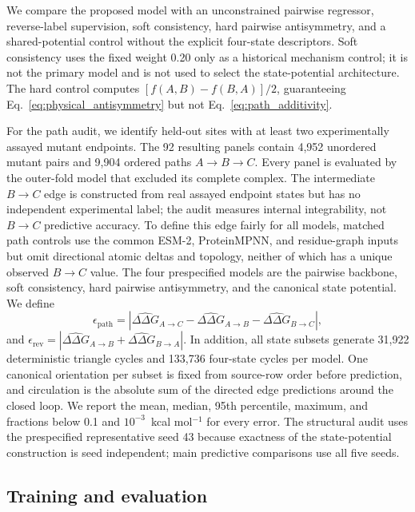 \documentclass[preprint,12pt]{elsarticle}
\newcommand{\ddg}{\Delta\Delta G}
\begin{document}
We compare the proposed model with an unconstrained pairwise regressor, reverse-label supervision, soft consistency, hard pairwise antisymmetry, and a shared-potential control without the explicit four-state descriptors. Soft consistency uses the fixed weight 0.20 only as a historical mechanism control; it is not the primary model and is not used to select the state-potential architecture. The hard control computes $[f(A,B)-f(B,A)]/2$, guaranteeing Eq.~\eqref{eq:physical_antisymmetry} but not Eq.~\eqref{eq:path_additivity}.

For the path audit, we identify held-out sites with at least two experimentally assayed mutant endpoints. The 92 resulting panels contain 4,952 unordered mutant pairs and 9,904 ordered paths $A\rightarrow B\rightarrow C$. Every panel is evaluated by the outer-fold model that excluded its complete complex. The intermediate $B\rightarrow C$ edge is constructed from real assayed endpoint states but has no independent experimental label; the audit measures internal integrability, not $B\rightarrow C$ predictive accuracy. To define this edge fairly for all models, matched path controls use the common ESM-2, ProteinMPNN, and residue-graph inputs but omit directional atomic deltas and topology, neither of which has a unique observed $B\rightarrow C$ value. The four prespecified models are the pairwise backbone, soft consistency, hard pairwise antisymmetry, and the canonical state potential. We define
\begin{equation}
 \epsilon_{\mathrm{path}}=
 \left|\widehat{\ddg}_{A\rightarrow C}
 -\widehat{\ddg}_{A\rightarrow B}
 -\widehat{\ddg}_{B\rightarrow C}\right|,
\end{equation}
and $\epsilon_{\mathrm{rev}}=|\widehat{\ddg}_{A\rightarrow B}+\widehat{\ddg}_{B\rightarrow A}|$. In addition, all state subsets generate 31,922 deterministic triangle cycles and 133,736 four-state cycles per model. One canonical orientation per subset is fixed from source-row order before prediction, and circulation is the absolute sum of the directed edge predictions around the closed loop. We report the mean, median, 95th percentile, maximum, and fractions below 0.1 and $10^{-3}$~kcal mol$^{-1}$ for every error. The structural audit uses the prespecified representative seed 43 because exactness of the state-potential construction is seed independent; main predictive comparisons use all five seeds.

\subsection{Training and evaluation}
\end{document}
